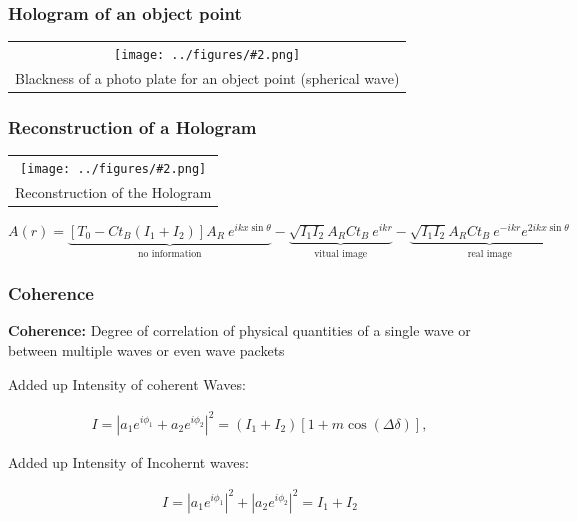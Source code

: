 \documentclass{beamer}
\newcommand{\gra}[3][]{
	\begin{table}
	\centering
	\begin{tabular}[width=\textwidth]{c}
		\texttt{[image: ../figures/\#2.png]}\\
		\small #3
	\end{tabular}
	\end{table}
}
\begin{document}
\begin{frame}
	\frametitle{Hologram of an object point}
	\gra[0.8]{obj}{Blackness of a photo plate for an object point (spherical wave) \footfullcite{staats}}
\end{frame}
\begin{frame}
	\frametitle{Reconstruction of a Hologram}
	
	\gra[0.5]{Reconstruction1}{Reconstruction of the Hologram \footfullcite{staats}}
	$A(r)=\underbrace{[T_0-Ct_B(I_1+I_2)]A_R\ e^{ikx \sin\theta}}_{\mbox{no information}} - \underbrace{\sqrt{I_1I_2}A_RCt_B\ e^{ikr}}_{\mbox{vitual image}} - \underbrace{\sqrt{I_1I_2}A_RCt_B\ e^{-ikr}e^{2ikx \sin\theta}}_{\mbox{real image}}$
	
\end{frame}
\begin{frame}
	\frametitle{Coherence}
	\textbf{Coherence:} Degree of correlation of physical quantities of a single wave or between multiple waves or even wave packets
	
	Added up Intensity of coherent Waves:
	
	\begin{align}
	I=\left| a_1 e^{i \phi_1} + a_2 e^{i \phi_2} \right|^2 = \left(I_1+I_2 \right) \left[ 1 + m \cos(\Delta \delta)\right], 
	\end{align}
	
	Added up Intensity of Incohernt waves:
	
	\begin{align}
	I=\left| a_1 e^{i \phi_1} \right|^2+ \left| a_2 e^{i \phi_2}\right|^2 = I_1+I_2
	\end{align}
\end{frame}
\end{document}
